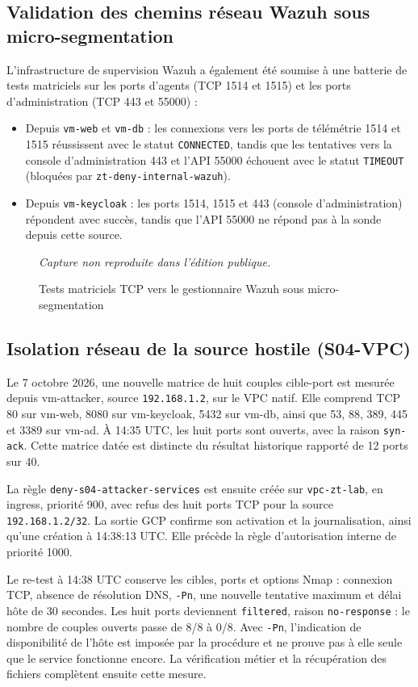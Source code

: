 \documentclass[a4paper,12pt]{report}
\newcommand{\publiccapture}[1]{%
  \begin{figure}[H]\centering
  {\footnotesize\itshape Capture non reproduite dans l'édition publique.}
  \caption{#1}\end{figure}}
\begin{document}
\subsection{Validation des chemins réseau Wazuh sous micro-segmentation}
L'infrastructure de supervision Wazuh a également été soumise à une batterie de tests matriciels sur les ports d'agents (TCP 1514 et 1515) et les ports d'administration (TCP 443 et 55000) :
\begin{itemize}
\item Depuis \texttt{vm-web} et \texttt{vm-db} : les connexions vers les ports de télémétrie 1514 et 1515 réussissent avec le statut \texttt{CONNECTED}, tandis que les tentatives vers la console d'administration 443 et l'API 55000 échouent avec le statut \texttt{TIMEOUT} (bloquées par \texttt{zt-deny-internal-wazuh}).
\item Depuis \texttt{vm-keycloak} : les ports 1514, 1515 et 443 (console d'administration) répondent avec succès, tandis que l'API 55000 ne répond pas à la sonde depuis cette source.
\end{itemize}

\publiccapture{Tests matriciels TCP vers le gestionnaire Wazuh sous micro-segmentation}

\subsection{Isolation réseau de la source hostile (S04-VPC)}
\label{sec:s04-vpc}
Le 7 octobre 2026, une nouvelle matrice de huit couples cible-port est mesurée depuis vm-attacker, source \texttt{192.168.1.2}, sur le VPC natif. Elle comprend TCP 80 sur vm-web, 8080 sur vm-keycloak, 5432 sur vm-db, ainsi que 53, 88, 389, 445 et 3389 sur vm-ad. À 14:35 UTC, les huit ports sont ouverts, avec la raison \texttt{syn-ack}. Cette matrice datée est distincte du résultat historique rapporté de 12 ports sur 40.

La règle \texttt{deny-s04-attacker-services} est ensuite créée sur \texttt{vpc-zt-lab}, en ingress, priorité 900, avec refus des huit ports TCP pour la source \texttt{192.168.1.2/32}. La sortie GCP confirme son activation et la journalisation, ainsi qu'une création à 14:38:13 UTC. Elle précède la règle d'autorisation interne de priorité 1000.

Le re-test à 14:38 UTC conserve les cibles, ports et options Nmap : connexion TCP, absence de résolution DNS, \texttt{-Pn}, une nouvelle tentative maximum et délai hôte de 30 secondes. Les huit ports deviennent \texttt{filtered}, raison \texttt{no-response} : le nombre de couples ouverts passe de 8/8 à 0/8. Avec \texttt{-Pn}, l'indication de disponibilité de l'hôte est imposée par la procédure et ne prouve pas à elle seule que le service fonctionne encore. La vérification métier et la récupération des fichiers complètent ensuite cette mesure.
\end{document}
